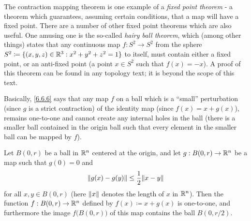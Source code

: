 \begin{rmk}\label{6.6.5}
  The contraction mapping theorem is one example of a \emph{fixed point theorem}
  - a theorem which guarantees, assuming certain conditions, that a map will have a fixed point.
  There are a number of other fixed point theorems which are also useful.
  One amusing one is the so-called \emph{hairy ball theorem}, which (among other things) states that any continuous map \(f : S^2 \to S^2\) from the sphere \(S^2 \coloneqq \{(x, y, z) \in \R^3 : x^2 + y^2 + z^2 = 1\}\) to itself, must contain either a fixed point, or an anti-fixed point
  (a point \(x \in S^2\) such that \(f(x) = -x\)).
  A proof of this theorem can be found in any topology text;
  it is beyond the scope of this text.
\end{rmk}

\begin{note}
  Basically, \cref{6.6.6} says that any map \(f\) on a ball which is a ``small'' perturbation (since \(g\) is a strict contraction) of the identity map (since \(f(x) = x + g(x)\)), remains one-to-one and cannot create any internal holes in the ball
  (there is a smaller ball contained in the origin ball such that every element in the smaller ball can be mapped by \(f\)).
\end{note}

\begin{lem}\label{6.6.6}
  Let \(B(0, r)\) be a ball in \(\R^n\) centered at the origin, and let \(g : B(0, r) \to \R^n\) be a map such that \(g(0) = 0\) and
  \[
    \norm*{g(x) - g(y)} \leq \frac{1}{2} \norm*{x - y}
  \]
  for all \(x, y \in B(0, r)\)
  (here \(\norm*{x}\) denotes the length of \(x\) in \(\R^n\)).
  Then the function \(f : B(0, r) \to \R^n\) defined by \(f(x) \coloneqq x + g(x)\) is one-to-one, and furthermore the image \(f\big(B(0, r)\big)\) of this map contains the ball \(B(0, r / 2)\).
\end{lem}

